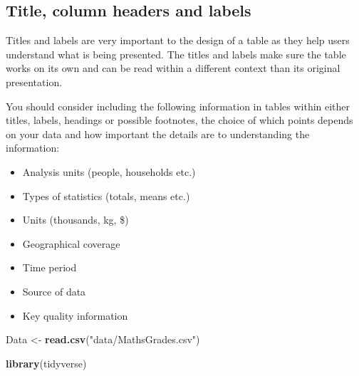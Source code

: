 \documentclass[
]{book}
\newenvironment{Shaded}{\begin{snugshade}}{\end{snugshade}}
\newcommand{\DataTypeTok}[1]{\textcolor[rgb]{0.13,0.29,0.53}{#1}}
\newcommand{\KeywordTok}[1]{\textcolor[rgb]{0.13,0.29,0.53}{\textbf{#1}}}
\newcommand{\NormalTok}[1]{#1}
\newcommand{\OperatorTok}[1]{\textcolor[rgb]{0.81,0.36,0.00}{\textbf{#1}}}
\newcommand{\StringTok}[1]{\textcolor[rgb]{0.31,0.60,0.02}{#1}}
\providecommand{\tightlist}{%
  \setlength{\itemsep}{0pt}\setlength{\parskip}{0pt}}
\begin{document}
\hypertarget{title-column-headers-and-labels}{%
\subsection{Title, column headers and labels}\label{title-column-headers-and-labels}}

Titles and labels are very important to the design of a table as they help users understand what is being presented. The titles and labels make sure the table works on its own and can be read within a different context than its original presentation.

You should consider including the following information in tables within either titles, labels, headings or possible footnotes, the choice of which points depends on your data and how important the details are to understanding the information:

\begin{itemize}
\tightlist
\item
  Analysis units (people, households etc.)
\item
  Types of statistics (totals, means etc.)
\item
  Units (thousands, kg, \$)
\item
  Geographical coverage
\item
  Time period
\item
  Source of data
\item
  Key quality information
\end{itemize}

\begin{Shaded}
\begin{Highlighting}[]
\NormalTok{Data <-}\StringTok{ }\KeywordTok{read.csv}\NormalTok{(}\StringTok{"data/MathsGrades.csv"}\NormalTok{)}
\end{Highlighting}
\end{Shaded}

\begin{Shaded}
\begin{Highlighting}[]
\KeywordTok{library}\NormalTok{(tidyverse)}
\end{Highlighting}
\end{Shaded}

\begin{Shaded}
\end{Shaded}
\end{document}
